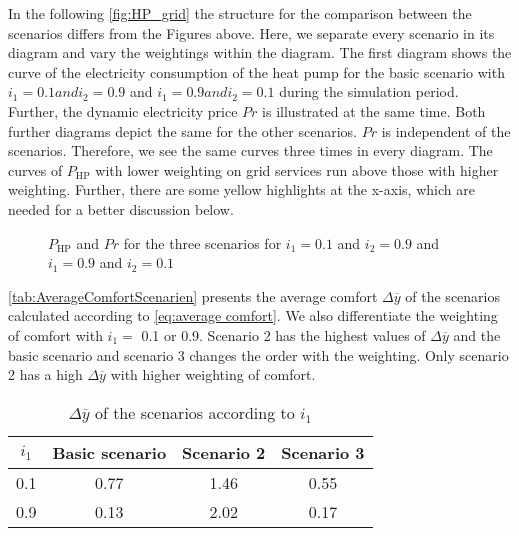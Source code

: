 In the following \autoref{fig:HP_grid} the structure for the comparison between the scenarios differs from the Figures above. Here, we separate every scenario in its diagram and vary the weightings within the diagram. The first diagram shows the curve of the electricity consumption of the heat pump for the basic scenario with $i_\text{1} = 0.1 and i_\text{2} = 0.9$ and $i_\text{1} = 0.9 and i_\text{2} = 0.1$ during the simulation period. Further, the dynamic electricity price $Pr$ is illustrated at the same time. Both further diagrams depict the same for the other scenarios. $Pr$ is independent of the scenarios. Therefore, we see the same curves three times in every diagram. The curves of $P_\text{HP}$ with lower weighting on grid services run above those with higher weighting. Further, there are some yellow highlights at the x-axis, which are needed for a better discussion below. 
    \begin{figure}[H]
           \centering
        \def\svgwidth{0.9\textwidth}
        
        \caption{$P_\text{HP}$ and $Pr$ for the three scenarios for $i_\text{1} = 0.1$ and $i_\text{2} = 0.9$ and $i_\text{1} = 0.9$ and $i_\text{2} = 0.1$}
         \label{fig:HP_grid}
    \end{figure}
    
\autoref{tab:AverageComfortScenarien} presents the average comfort $\Delta \overline{y}$ of the scenarios calculated according to \autoref{eq:average comfort}. We also differentiate the weighting of comfort with $i_\text{1} =$ 0.1 or 0.9. Scenario 2 has the highest values of $\Delta \overline{y}$ and the basic scenario and scenario 3 changes the order with the weighting. Only scenario 2 has a high $\Delta \overline{y}$ with higher weighting of comfort.  
    \begin{table}[H]
        \centering
        \begin{tabular}{c||c|c|c}
          $i_\text{1}$  &  Basic scenario & Scenario 2 & Scenario 3\\
          \hline  \hline
             0.1 & 0.77 & 1.46 & 0.55\\
             0.9 & 0.13 & 2.02 & 0.17\\
        \end{tabular}
        \caption{$\Delta \overline{y}$ of the scenarios according to $i_\text{1}$}
        \label{tab:AverageComfortScenarien}
    \end{table}
    
